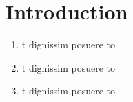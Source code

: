 \chapter{Introduction}

\begin{enumerate}

As the trend of exporting more and more of server operations to



  \item t dignissim posuere to
  \item t dignissim posuere to
  \item t dignissim posuere to
\end{enumerate}
